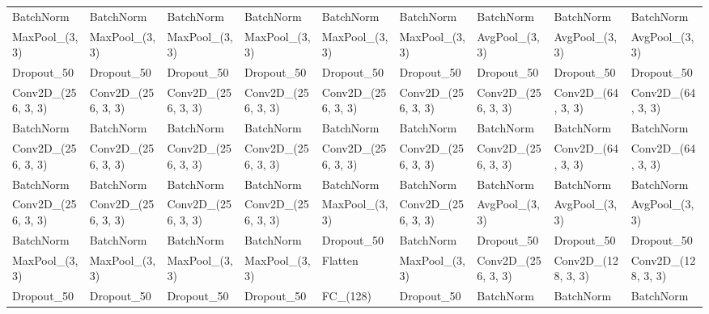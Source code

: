 \begin{table}[!htb]
{\begin{tabular}{@{}lllllllll@{}}
BatchNorm             & BatchNorm             & BatchNorm             & BatchNorm             & BatchNorm             & BatchNorm             & BatchNorm             & BatchNorm             & BatchNorm             \\
MaxPool\_(3, 3)       & MaxPool\_(3, 3)       & MaxPool\_(3, 3)       & MaxPool\_(3, 3)       & MaxPool\_(3, 3)       & MaxPool\_(3, 3)       & AvgPool\_(3, 3)       & AvgPool\_(3, 3)       & AvgPool\_(3, 3)       \\
Dropout\_50           & Dropout\_50           & Dropout\_50           & Dropout\_50           & Dropout\_50           & Dropout\_50           & Dropout\_50           & Dropout\_50           & Dropout\_50           \\
Conv2D\_(256, 3, 3)   & Conv2D\_(256, 3, 3)   & Conv2D\_(256, 3, 3)   & Conv2D\_(256, 3, 3)   & Conv2D\_(256, 3, 3)   & Conv2D\_(256, 3, 3)   & Conv2D\_(256, 3, 3)   & Conv2D\_(64, 3, 3)    & Conv2D\_(64, 3, 3)    \\
BatchNorm             & BatchNorm             & BatchNorm             & BatchNorm             & BatchNorm             & BatchNorm             & BatchNorm             & BatchNorm             & BatchNorm             \\
Conv2D\_(256, 3, 3)   & Conv2D\_(256, 3, 3)   & Conv2D\_(256, 3, 3)   & Conv2D\_(256, 3, 3)   & Conv2D\_(256, 3, 3)   & Conv2D\_(256, 3, 3)   & Conv2D\_(256, 3, 3)   & Conv2D\_(64, 3, 3)    & Conv2D\_(64, 3, 3)    \\
BatchNorm             & BatchNorm             & BatchNorm             & BatchNorm             & BatchNorm             & BatchNorm             & BatchNorm             & BatchNorm             & BatchNorm             \\
Conv2D\_(256, 3, 3)   & Conv2D\_(256, 3, 3)   & Conv2D\_(256, 3, 3)   & Conv2D\_(256, 3, 3)   & MaxPool\_(3, 3)       & Conv2D\_(256, 3, 3)   & AvgPool\_(3, 3)       & AvgPool\_(3, 3)       & AvgPool\_(3, 3)       \\
BatchNorm             & BatchNorm             & BatchNorm             & BatchNorm             & Dropout\_50           & BatchNorm             & Dropout\_50           & Dropout\_50           & Dropout\_50           \\
MaxPool\_(3, 3)       & MaxPool\_(3, 3)       & MaxPool\_(3, 3)       & MaxPool\_(3, 3)       & Flatten               & MaxPool\_(3, 3)       & Conv2D\_(256, 3, 3)   & Conv2D\_(128, 3, 3)   & Conv2D\_(128, 3, 3)   \\
Dropout\_50           & Dropout\_50           & Dropout\_50           & Dropout\_50           & FC\_(128)             & Dropout\_50           & BatchNorm             & BatchNorm             & BatchNorm             \\

\end{tabular}}
\end{table}
